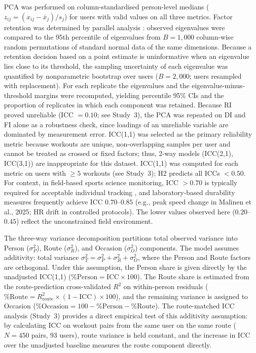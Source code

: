 \documentclass[times, twoside]{zHenriquesLab-StyleBioRxiv}
\begin{document}
PCA was performed on column-standardised person-level medians ($z_{ij} = (x_{ij} - \bar{x}_j) / s_j$) for users with valid values on all three metrics. Factor retention was determined by parallel analysis \cite{horn1965}: observed eigenvalues were compared to the 95th percentile of eigenvalues from $B = 1{,}000$ column-wise random permutations of standard normal data of the same dimensions. Because a retention decision based on a point estimate is uninformative when an eigenvalue lies close to its threshold, the sampling uncertainty of each eigenvalue was quantified by nonparametric bootstrap over users ($B = 2{,}000$; users resampled with replacement). For each replicate the eigenvalues and the eigenvalue-minus-threshold margins were recomputed, yielding percentile 95\% CIs and the proportion of replicates in which each component was retained. Because RI proved unreliable (ICC $= 0.10$; see Study~3), the PCA was repeated on DI and FI alone as a robustness check, since loadings of an unreliable variable are dominated by measurement error. ICC(1,1) was selected as the primary reliability metric because workouts are unique, non-overlapping samples per user and cannot be treated as crossed or fixed factors; thus, 2-way models (ICC(2,1), ICC(3,1)) are inappropriate for this dataset. ICC(1,1) was computed for each metric on users with $\geq 5$ workouts (see Study~3); H2 predicts all ICCs $< 0.50$. For context, in field-based sports science monitoring, ICC $> 0.70$ is typically required for acceptable individual tracking \cite{bourdon2017, hopkins2000}, and laboratory-based durability measures frequently achieve ICC $0.70$--$0.85$ (e.g., peak speed change in Malinen et al., 2025; HR drift in controlled protocols). The lower values observed here ($0.20$--$0.45$) reflect the unconstrained field environment.

The three-way variance decomposition partitions total observed variance into Person ($\sigma^2_P$), Route ($\sigma^2_R$), and Occasion ($\sigma^2_O$) components. The model assumes additivity: total variance $\sigma^2_T = \sigma^2_P + \sigma^2_R + \sigma^2_O$, where the Person and Route factors are orthogonal. Under this assumption, the Person share is given directly by the unadjusted ICC(1,1) ($\% \text{Person} = \text{ICC} \times 100$). The Route share is estimated from the route-prediction cross-validated $R^2$ on within-person residuals ($\% \text{Route} = R^2_{\text{route}} \times (1 - \text{ICC}) \times 100$), and the remaining variance is assigned to Occasion ($\% \text{Occasion} = 100 - \% \text{Person} - \% \text{Route}$). The route-matched ICC analysis (Study~3) provides a direct empirical test of this additivity assumption: by calculating ICC on workout pairs from the same user on the same route ($N = 450$ pairs, 93 users), route variance is held constant, and the increase in ICC over the unadjusted baseline measures the route component directly.
\end{document}
